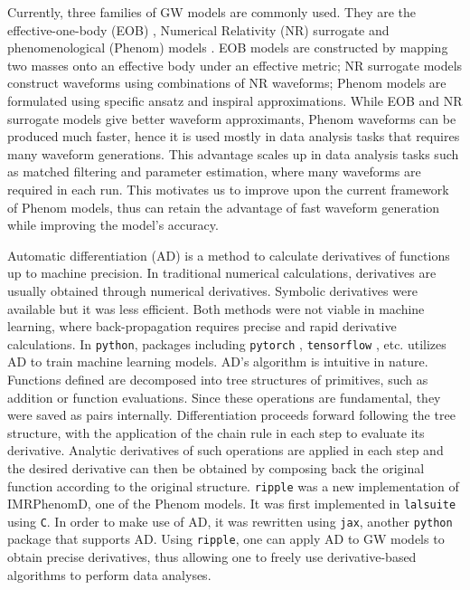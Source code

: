 \documentclass[twocolumn]{aastex631}
\newcommand{\ripple}{\texttt{ripple}}
\newcommand{\python}{\texttt{python}}
\newcommand{\jax}{\texttt{jax}}
\begin{document}
Currently, three families of GW models are commonly used. They are the effective-one-body (EOB) \cite{taracchini2014effective}, Numerical Relativity (NR) surrogate \cite{varma2019surrogate} and phenomenological (Phenom) models \cite{husa2016frequency,khan2016frequency}. EOB models are constructed by mapping two masses onto an effective body under an effective metric; NR surrogate models construct waveforms using combinations of NR waveforms; Phenom models are formulated using specific ansatz and inspiral approximations. While EOB and NR surrogate models give better waveform approximants, Phenom waveforms can be produced much faster, hence it is used mostly in data analysis tasks that requires many waveform generations. This advantage scales up in data analysis tasks such as matched filtering and parameter estimation, where many waveforms are required in each run. This motivates us to improve upon the current framework of Phenom models, thus can retain the advantage of fast waveform generation while improving the model's accuracy. 

Automatic differentiation (AD) is a method to calculate derivatives of functions up to machine precision. In traditional numerical calculations, derivatives are usually obtained through numerical derivatives. Symbolic derivatives were available but it was less efficient. Both methods were not viable in machine learning, where back-propagation requires precise and rapid derivative calculations. In {\python}, packages including \texttt{pytorch} \cite{pytorch}, \texttt{tensorflow} \cite{tensorflow2015-whitepaper}, etc. utilizes AD to train machine learning models. AD's algorithm is intuitive in nature. Functions defined are decomposed into tree structures of primitives, such as addition or function evaluations. Since these operations are fundamental, they were saved as pairs internally. Differentiation proceeds forward following the tree structure, with the application of the chain rule in each step to evaluate its derivative. Analytic derivatives of such operations are applied in each step and the desired derivative can then be obtained by composing back the original function according to the original structure. {\ripple} \cite{ripple} was a new implementation of IMRPhenomD, one of the Phenom models. It was first implemented in \texttt{lalsuite} using \texttt{C}. In order to make use of AD, it was rewritten using \jax, another {\python} package that supports AD. Using {\ripple}, one can apply AD to GW models to obtain precise derivatives, thus allowing one to freely use derivative-based algorithms to perform data analyses. 
\end{document}
